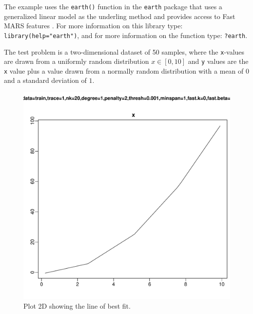 The example uses the \texttt{earth()} function in the \texttt{earth} package that uses a generalized linear model as the underling method and provides access to Fast MARS features \cite{Milborrow2012}. For more information on this library type: \texttt{library(help="earth")}, and for more information on the function type: \texttt{?earth}.

The test problem is a two-dimensional dataset of 50 samples, where the \texttt{x}-values are drawn from a uniformly random distribution $x \in [0,10]$ and \texttt{y} values are the \texttt{x} value plus a value drawn from a normally random distribution with a mean of $0$ and a standard deviation of $1$.



\begin{figure}[htp]
\centering
\includegraphics[scale=0.45]{a_regression/multivariate_adaptive_regression_splines_result.pdf}
\caption{Plot 2D showing the line of best fit.}
\label{plot:multivariate_adaptive_regression_splines_result}
\end{figure}

